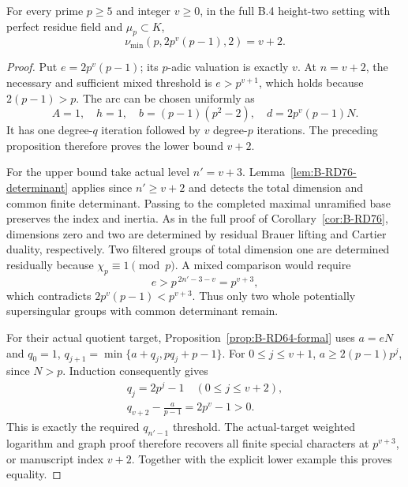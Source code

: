 \begin{theorem}
\label{thm:B-RD101-exact}
For every prime $p\ge5$ and integer $v\ge0$, in the
full B.4 height-two setting with perfect residue field
and $\mu_p\subset K$,
\[
              \nu_{\min}(p,2p^v(p-1),2)=v+2 .
                                                        \tag{B-RD101.13}
\]
\end{theorem}
\begin{proof}
Put $e=2p^v(p-1)$; its $p$-adic valuation is exactly $v$.
At $n=v+2$, the necessary and sufficient mixed threshold
is $e>p^{v+1}$, which holds because $2(p-1)>p$.
The arc can be chosen uniformly as
\[
 A=1,\quad h=1,\quad b=(p-1)(p^2-2),\quad
 d=2p^v(p-1)N .
                                                        \tag{B-RD101.14}
\]
It has one degree-$q$ iteration followed by $v$
degree-$p$ iterations. The preceding proposition
therefore proves the lower bound $v+2$.

For the upper bound take actual level $n'=v+3$.
Lemma~\ref{lem:B-RD76-determinant} applies since
$n'\ge v+2$ and detects the total dimension and common
finite determinant. Passing to the completed maximal
unramified base preserves the index and inertia.
As in the full proof of Corollary~\ref{cor:B-RD76},
dimensions zero and two are determined by residual
Brauer lifting and Cartier duality, respectively.
Two filtered groups of total dimension one are
determined residually because $\chi_p\equiv1\pmod p$.
A mixed comparison would require
\[
               e>p^{\,2n'-3-v}=p^{v+3},
                                                        \tag{B-RD101.15}
\]
which contradicts $2p^v(p-1)<p^{v+3}$.
Thus only two whole potentially supersingular groups
with common determinant remain.

For their actual quotient target,
Proposition~\ref{prop:B-RD64-formal} uses
$a=eN$ and $q_0=1$,
$q_{j+1}=\min\{a+q_j,pq_j+p-1\}$.
For $0\le j\le v+1$,
$a\ge2(p-1)p^j$, since $N>p$.
Induction consequently gives
\[
\begin{gathered}
 q_j=2p^j-1\quad(0\le j\le v+2),\\
 q_{v+2}-\frac a{p-1}=2p^v-1>0 .
\end{gathered}
                                                        \tag{B-RD101.16}
\]
This is exactly the required $q_{n'-1}$ threshold.
The actual-target weighted logarithm and graph proof
therefore recovers all finite special characters at
$p^{v+3}$, or manuscript index $v+2$.
Together with the explicit lower example this proves equality.
\end{proof}

